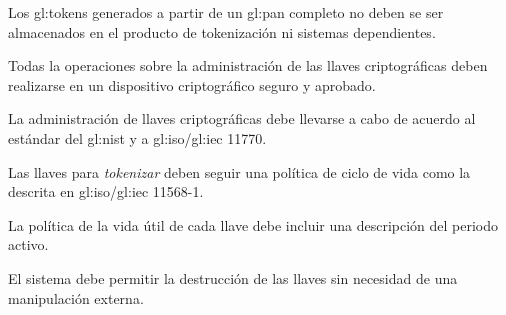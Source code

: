 {
  Los \glspl{gl:token} generados a partir de un \gls{gl:pan} completo no 
  deben se ser almacenados en el producto de tokenización ni sistemas 
  dependientes.
}



{
  Todas la operaciones sobre la administración de las llaves criptográficas
  deben realizarse en un dispositivo criptográfico seguro y aprobado.
}


{
  La administración de llaves criptográficas debe llevarse a cabo de
  acuerdo al estándar del \gls{gl:nist} \cite{nist_llaves} y a
  \acrshort{gl:iso}/\acrshort{gl:iec} 11770.

  {
    Las llaves para \textit{tokenizar} deben seguir una política de
    ciclo de vida como la descrita en  \acrshort{gl:iso}/\acrshort{gl:iec}
    11568-1.
  }

  {
    La política de la vida útil de cada llave debe incluir una
    descripción del periodo activo.
  }

  {
    El sistema debe permitir la destrucción de las llaves sin necesidad
    de una manipulación externa.
  }
}


